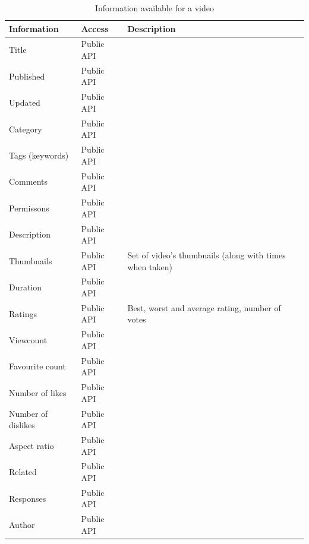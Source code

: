 \begin{table}[ht]
	\begin{tabular}{|p{3cm} | l | p{4cm}|}\hline
		Information & Access & Description\\ \hline

		Title & Public API & \\
		Published & Public API & \\
		Updated & Public API & \\
		Category & Public API & \\
		Tags (keywords) & Public API & \\
		Comments & Public API & \\
		Permissons & Public API & \\
		Description & Public API & \\
		Thumbnails & Public API & Set of video's thumbnails (along with times
		when taken) \\
		Duration & Public API & \\
		Ratings & Public API & Best, worst and average rating, number of votes \\
		Viewcount & Public API & \\
		Favourite count & Public API & \\
		Number of likes & Public API & \\
		Number of dislikes & Public API & \\
		Aspect ratio & Public API & \\
		Related & Public API & \\
		Responses & Public API & \\
		Author & Public API & \\ \hline
	\end{tabular}
	\caption{Information available for a video}
	\label{ut_video_info}
\end{table}

